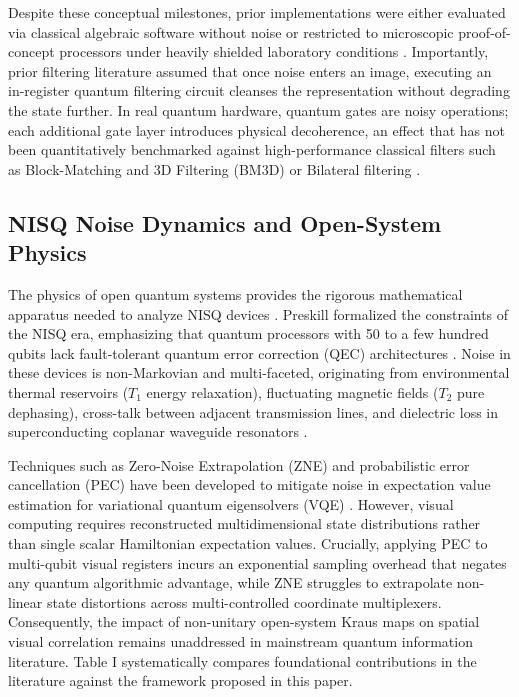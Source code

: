 \documentclass[12pt,onecolumn,draftclsnofoot]{IEEEtran}
\begin{document}
Despite these conceptual milestones, prior implementations were either evaluated via classical algebraic software without noise or restricted to microscopic proof-of-concept processors under heavily shielded laboratory conditions \cite{yao2017quantum}. Importantly, prior filtering literature assumed that once noise enters an image, executing an in-register quantum filtering circuit cleanses the representation without degrading the state further. In real quantum hardware, quantum gates are noisy operations; each additional gate layer introduces physical decoherence, an effect that has not been quantitatively benchmarked against high-performance classical filters such as Block-Matching and 3D Filtering (BM3D) \cite{dabov2007image} or Bilateral filtering \cite{tomasi1998bilateral}.

\subsection{NISQ Noise Dynamics and Open-System Physics}
The physics of open quantum systems provides the rigorous mathematical apparatus needed to analyze NISQ devices \cite{nielsen2010quantum, preskill2018quantum}. Preskill formalized the constraints of the NISQ era, emphasizing that quantum processors with 50 to a few hundred qubits lack fault-tolerant quantum error correction (QEC) architectures \cite{preskill2018quantum}. Noise in these devices is non-Markovian and multi-faceted, originating from environmental thermal reservoirs ($T_1$ energy relaxation), fluctuating magnetic fields ($T_2$ pure dephasing), cross-talk between adjacent transmission lines, and dielectric loss in superconducting coplanar waveguide resonators \cite{kandala2017hardware, magesan2011scalable}.

Techniques such as Zero-Noise Extrapolation (ZNE) and probabilistic error cancellation (PEC) have been developed to mitigate noise in expectation value estimation for variational quantum eigensolvers (VQE) \cite{temme2017error, li2017efficient, cerezo2021variational}. However, visual computing requires reconstructed multidimensional state distributions rather than single scalar Hamiltonian expectation values. Crucially, applying PEC to multi-qubit visual registers incurs an exponential sampling overhead that negates any quantum algorithmic advantage, while ZNE struggles to extrapolate non-linear state distortions across multi-controlled coordinate multiplexers. Consequently, the impact of non-unitary open-system Kraus maps on spatial visual correlation remains unaddressed in mainstream quantum information literature. Table I systematically compares foundational contributions in the literature against the framework proposed in this paper.
\end{document}
